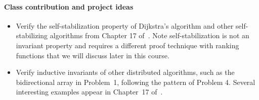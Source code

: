 \documentclass[11pt]{article}
\begin{document}
\paragraph{Class contribution and project ideas}
\begin{itemize}
\item Verify the self-stabilization property of Dijkstra's algorithm and other self-stabilizing algorithms from Chapter 17 of~\cite{Ghosh:2014:DSA}. Note self-stabilization is not an invariant property and requires a different proof technique with ranking functions  that we will discuss later in this course.
\item Verify inductive invariants of other distributed algorithms, such as the bidirectional array in Problem~1, following the pattern of Problem 4. Several interesting examples appear in Chapter~17 of~\cite{Ghosh:2014:DSA}.
\end{itemize}



\end{document}
